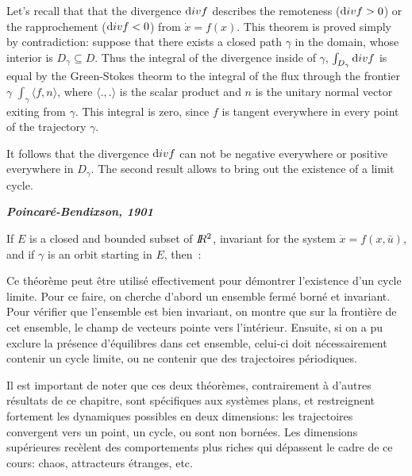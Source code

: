 Let's recall that that the divergence ${\mbox div}f$ describes the remoteness (${\mbox div}f >0$) or the rapprochement (${\mbox div}f <0$) from $\dot{x}=f(x)$.
This theorem is proved simply by contradiction: suppose that there exists a closed path $\gamma$ in the domain, whose interior is $D_{\gamma} \subseteq D$.
Thus the integral of the divergence inside of $\gamma$, $\int_{D_\gamma}  {\mbox div}f$ is equal by the Green-Stokes theorm to the integral
of the flux through the frontier $\gamma$ $\int_\gamma \langle f, n \rangle$, where $\langle.,.\rangle$
is the scalar product and $n$ is the unitary normal vector exiting from $\gamma$.
This integral is zero, since $f$ is tangent everywhere in every point of the trajectory $\gamma$. 

It follows that the divergence ${\mbox div}f$ can not be negative everywhere or positive everywhere in $D_{\gamma}$.
The second result allows to bring out the existence of a limit cycle.

\begin{theoreme} {\bf \em Poincar{é}-Bendixson, 1901}

If $E$ is a closed and bounded subset of $I \! \! R^2$, invariant for the system $\dot x= f(x,\bar u)$, and if $\gamma$ is an orbit
starting in $E$, then~:

\end{theoreme}


Ce th{é}or{è}me peut {ê}tre utilis{é} effectivement pour d{é}montrer l'existence d'un
cycle limite. Pour ce faire, on cherche d'abord un ensemble ferm{é} born{é} et invariant.
Pour v{é}rifier que l'ensemble est bien invariant, on montre que sur la fronti{è}re de cet
ensemble, le champ de vecteurs pointe vers l'int{é}rieur. Ensuite, si on a pu exclure la
pr{é}sence d'{é}quilibres dans cet ensemble, celui-ci doit n{é}cessairement contenir un
cycle limite, ou ne contenir que des trajectoires p{é}riodiques.

Il est important de noter que ces deux théorèmes, contrairement à d'autres résultats de ce chapitre, sont spécifiques aux systèmes plans, et restreignent fortement les dynamiques possibles en deux dimensions: les trajectoires convergent vers un point, un cycle, ou sont non bornées. Les dimensions supérieures recèlent des comportements plus riches qui dépassent le cadre de ce cours: chaos, attracteurs étranges, etc.

